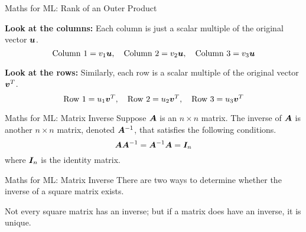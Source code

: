 \documentclass[handout]{beamer}
\begin{document}
\begin{frame}{Maths for ML: Rank of an Outer Product}
\footnotesize
    \cleanitemize
    {
        \item \textbf{Look at the columns:} Each column is just a scalar multiple of the original vector $\bm{u}$.
        $$
        \text{Column 1} = v_1\bm{u}, \quad \text{Column 2} = v_2\bm{u}, \quad \text{Column 3} = v_3\bm{u}
        $$
        
        \item \textbf{Look at the rows:} Similarly, each row is a scalar multiple of the original vector $\bm{v}^T$.
         $$
        \text{Row 1} = u_1\bm{v}^T, \quad \text{Row 2} = u_2\bm{v}^T, \quad \text{Row 3} = u_3\bm{v}^T
        $$
    }

\end{frame}

\begin{frame}{Maths for ML: Matrix Inverse}
Suppose $\bm{A}$ is an $n \times n$ matrix. The inverse of $\bm{A}$ is another $n \times n$ matrix, denoted $\bm{A}^{-1}$, that satisfies the following conditions.
\[
\bm{A}\bm{A}^{-1}=\bm{A}^{-1} \bm{A}=\bm{I}_n
\]
where $\bm{I}_n$ is the identity matrix.

\end{frame}

\begin{frame}{Maths for ML: Matrix Inverse}
There are two ways to determine whether the inverse of a square matrix exists.

 {Not every square matrix has an inverse; but if a matrix does have an inverse, it is unique.}
\end{frame}
\end{document}

